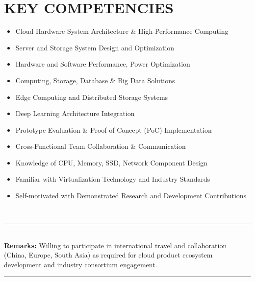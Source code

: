 \documentclass{article}%
\begin{document}
%
\section*{KEY COMPETENCIES}%
\label{sec:KEYCOMPETENCIES}%
\begin{itemize}%
\item%
Cloud Hardware System Architecture \& High{-}Performance Computing%
\item%
Server and Storage System Design and Optimization%
\item%
Hardware and Software Performance, Power Optimization%
\item%
Computing, Storage, Database \& Big Data Solutions%
\item%
Edge Computing and Distributed Storage Systems%
\item%
Deep Learning Architecture Integration%
\item%
Prototype Evaluation \& Proof of Concept (PoC) Implementation%
\item%
Cross{-}Functional Team Collaboration \& Communication%
\item%
Knowledge of CPU, Memory, SSD, Network Component Design%
\item%
Familiar with Virtualization Technology and Industry Standards%
\item%
Self{-}motivated with Demonstrated Research and Development Contributions%
\end{itemize}%
\\[1em]%
\hrule%
\\[1em]

%
\textbf{Remarks: }%
Willing to participate in international travel and collaboration (China, Europe, South Asia) as required for cloud product ecosystem development and industry consortium engagement.%
\\[1em]%
\hrule%
\end{document}
